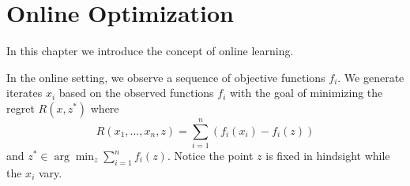 
\section{Online Optimization}
In this chapter we introduce the concept of online learning.

In the online setting, we observe a sequence of objective functions $f_i$. We generate iterates $x_i$ based on the
observed functions $f_i$ with the goal of minimizing the regret $R(x,z^*)$ where
\begin{equation}
 R(x_1,...,x_n,z) = \displaystyle\sum_{i = 1}^n (f_i(x_i) - f_i(z))
\end{equation}
and $z^*\in\arg\min_{z} \displaystyle\sum_{i = 1}^n f_i(z)$. Notice the point $z$ is fixed in hindsight while the $x_i$ vary.

